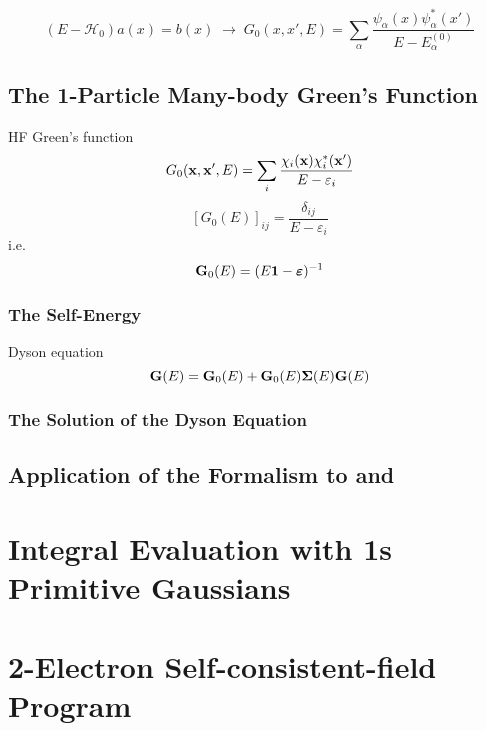 \documentclass[a4paper]{article}
\DeclareMathOperator{\ra}{\rightarrow}
\newcommand{\iden}{{\large \bm{1}}}
\numberwithin{equation}{section}
\begin{document}
\begin{equation}\label{key}
(E - \mathscr{H}_0)a(x) = b(x) \;\ra\;
G_0(x,x',E) = \sum_\alpha \dfrac{\psi_\alpha(x) \psi_\alpha^*(x')}{E - E_\alpha^{(0)}}
\end{equation}

\subsection{The 1-Particle Many-body Green's Function}
HF Green's function
\begin{equation}\label{key}
G_0(\vb{x}, \vb{x}', E) = \sum_i \dfrac{\chi_i(\vb{x})\chi_i^*(\vb{x}')}{E - \varepsilon_i}
\end{equation}
\begin{equation}\label{key}
[G_0(E)]_{ij} = \dfrac{\delta_{ij}}{E - \varepsilon_i}
\end{equation}
i.e.
\begin{equation}\label{key}
\vb{G}_0(E) = (E\iden - \bm\varepsilon)^{-1}
\end{equation}

\subsubsection{The Self-Energy}
Dyson equation
\begin{equation}\label{key}
\vb{G}(E) = \vb{G}_0(E) + \vb{G}_0(E)\bm\Sigma(E)\vb{G}(E)
\end{equation}

\subsubsection{The Solution of the Dyson Equation}

\subsection{Application of the Formalism to  and }






\renewcommand\thesection{\Alph{section}}
\setcounter{section}{0}
\section{Integral Evaluation with 1s Primitive Gaussians}

\section{2-Electron Self-consistent-field Program}
\end{document}
